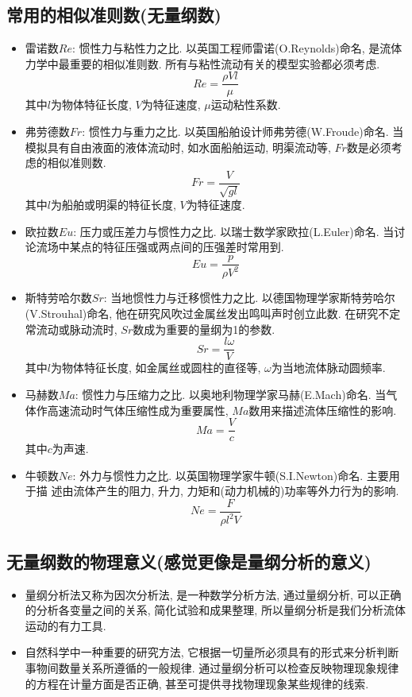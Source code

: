 \documentclass[a4paper,titlepage,twocolumn]{article}
\begin{document}
\subsection{常用的相似准则数(无量纲数)}
\begin{itemize}
\item 雷诺数$Re$: 惯性力与粘性力之比. 以英国工程师雷诺(O.Reynolds)命名, 是流体力学中最重要的相似准则数. 所有与粘性流动有关的模型实验都必须考虑.
\[
Re = \frac{\rho V l}{\mu}
\]
其中$l$为物体特征长度, $V$为特征速度, $\mu$运动粘性系数.

\item 弗劳德数$Fr$: 惯性力与重力之比. 以英国船舶设计师弗劳德(W.Froude)命名. 当模拟具有自由液面的液体流动时, 如水面船舶运动, 明渠流动等, $Fr$数是必须考虑的相似准则数.
\[
Fr = \frac{V}{\sqrt{gl}}
\]
其中$l$为船舶或明渠的特征长度, $V$为特征速度.


\item 欧拉数$Eu$: 压力或压差力与惯性力之比. 以瑞士数学家欧拉(L.Euler)命名. 当讨论流场中某点的特征压强或两点间的压强差时常用到.
\[
Eu = \frac{p}{\rho V^2}
\]


\item 斯特劳哈尔数$Sr$: 当地惯性力与迁移惯性力之比. 以德国物理学家斯特劳哈尔(V.Strouhal)命名, 他在研究风吹过金属丝发出鸣叫声时创立此数. 在研究不定常流动或脉动流时, $Sr$数成为重要的量纲为1的参数.
\[
Sr = \frac{l\omega}{V}
\]
其中$l$为物体特征长度, 如金属丝或圆柱的直径等, $\omega$为当地流体脉动圆频率.


\item 马赫数$Ma$: 惯性力与压缩力之比. 以奥地利物理学家马赫(E.Mach)命名. 当气体作高速流动时气体压缩性成为重要属性, $Ma$数用来描述流体压缩性的影响.
\[
Ma = \frac{V}{c}
\]
其中$c$为声速.

\item 牛顿数$Ne$: 外力与惯性力之比. 以英国物理学家牛顿(S.I.Newton)命名. 主要用于描
述由流体产生的阻力, 升力, 力矩和(动力机械的)功率等外力行为的影响.
\[
Ne = \frac{F}{\rho l^2 V}
\]
\end{itemize}


\subsection{无量纲数的物理意义(感觉更像是量纲分析的意义)}
\begin{itemize}
\item 量纲分析法又称为因次分析法, 是一种数学分析方法, 通过量纲分析, 可以正确的分析各变量之间的关系, 简化试验和成果整理, 所以量纲分析是我们分析流体运动的有力工具.

\item 自然科学中一种重要的研究方法, 它根据一切量所必须具有的形式来分析判断事物间数量关系所遵循的一般规律. 通过量纲分析可以检查反映物理现象规律的方程在计量方面是否正确, 甚至可提供寻找物理现象某些规律的线索.
\end{itemize}
\end{document}
